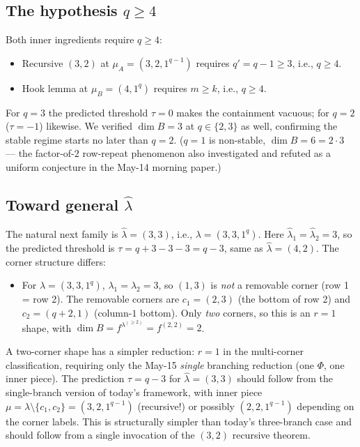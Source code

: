 \documentclass[11pt]{article}
\theoremstyle{definition}
\newcommand{\hatl}{\widehat\lambda}
\begin{document}
\subsection{The hypothesis $q \ge 4$}

Both inner ingredients require $q \ge 4$:
\begin{itemize}[topsep=0.3em,itemsep=0.1em]
\item Recursive $(3, 2)$ at $\mu_A = (3, 2, 1^{q-1})$ requires
   $q' = q - 1 \ge 3$, i.e., $q \ge 4$.
\item Hook lemma at $\mu_B = (4, 1^q)$ requires $m \ge k$, i.e.,
   $q \ge 4$.
\end{itemize}
For $q = 3$ the predicted threshold $\tau = 0$ makes the containment
vacuous; for $q = 2$ ($\tau = -1$) likewise.  We verified $\dim B
= 3$ at $q \in \{2, 3\}$ as well, confirming the stable regime
starts no later than $q = 2$.  ($q = 1$ is non-stable, $\dim B = 6
= 2 \cdot 3$ — the factor-of-$2$ row-repeat phenomenon also
investigated and refuted as a uniform conjecture in the May-14
morning paper.)

\subsection{Toward general $\hatl$}

The natural next family is $\hatl = (3, 3)$, i.e., $\lambda = (3,
3, 1^q)$.  Here $\hatl_1 = \hatl_2 = 3$, so the predicted threshold
is $\tau = q + 3 - 3 - 3 = q - 3$, same as $\hatl = (4, 2)$.  The
corner structure differs:
\begin{itemize}[topsep=0.3em,itemsep=0.1em]
\item For $\lambda = (3, 3, 1^q)$, $\lambda_1 = \lambda_2 = 3$, so
   $(1, 3)$ is \emph{not} a removable corner (row 1 = row 2).  The
   removable corners are $c_1 = (2, 3)$ (the bottom of row 2) and
   $c_2 = (q+2, 1)$ (column-$1$ bottom).  Only \emph{two} corners,
   so this is an $r = 1$ shape, with $\dim B = f^{\lambda^{(\ge 2)}}
   = f^{(2, 2)} = 2$.
\end{itemize}
A two-corner shape has a simpler reduction: $r = 1$ in the
multi-corner classification, requiring only the May-15 \emph{single}
branching reduction (one $\Phi$, one inner piece).  The prediction
$\tau = q - 3$ for $\hatl = (3, 3)$ should follow from the
single-branch version of today's framework, with inner piece
$\mu = \lambda \setminus \{c_1, c_2\} = (3, 2, 1^{q-1})$
(recursive!) or possibly $(2, 2, 1^{q-1})$ depending on the corner
labels.  This is structurally simpler than today's three-branch
case and should follow from a single invocation of the $(3, 2)$
recursive theorem.
\end{document}

